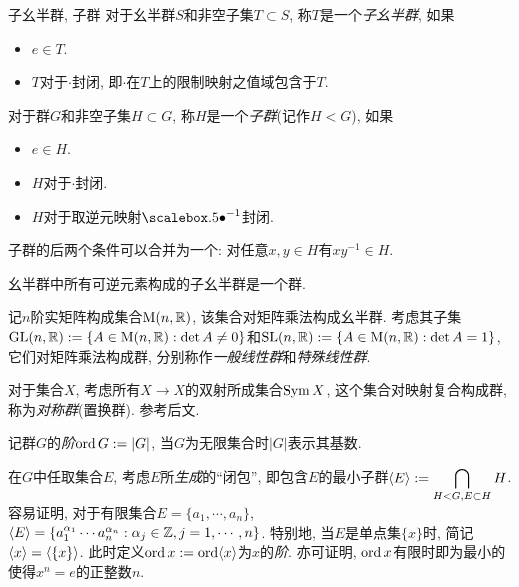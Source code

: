 \begin{definition}{子幺半群, 子群}
	对于幺半群$S$和非空子集$T \subset S$, 称$T$是一个\textit{子幺半群}, 如果
	\begin{itemize}
		\item $e \in T$. 
		\item $T$对于$\cdot$封闭, 即$\cdot$在$T$上的限制映射之值域包含于$T$. 
	\end{itemize}
	对于群$G$和非空子集$H \subset G$, 称$H$是一个\textit{子群}(记作$H<G$), 如果
	\begin{itemize}
		\item $e \in H$. 
		\item $H$对于$\cdot$封闭. 
		\item $H$对于取逆元映射$\bigcdot ^{-1}$封闭. 
	\end{itemize}
\end{definition}
\begin{remark}
	子群的后两个条件可以合并为一个: 对任意$x,y \in H$有$xy^{-1} \in H$. 
\end{remark}

\begin{example}
	幺半群中所有可逆元素构成的子幺半群是一个群. 
\end{example}

\begin{example}
	记$n$阶实矩阵构成集合$\mathrm{M}(n,\mathbb{R})$, 该集合对矩阵乘法构成幺半群. 考虑其子集$\mathrm{GL}(n,\mathbb{R}):= \{ A \in \mathrm{M}(n,\mathbb{R}):\det A \neq 0 \}$和$\mathrm{SL}(n,\mathbb{R}):= \{ A \in \mathrm{M}(n,\mathbb{R}):\det A =1 \}$, 它们对矩阵乘法构成群, 分别称作\textit{一般线性群}和\textit{特殊线性群}. 
\end{example}

\begin{example}
	对于集合$X$, 考虑所有$X \to X$的双射所成集合$\operatorname{Sym} X$, 这个集合对映射复合构成群, 称为\textit{对称群}(置换群). 参考后文. 
\end{example}

记群$G$的\textit{阶}$\operatorname{ord} G:=|G|$, 当$G$为无限集合时$|G|$表示其基数. 

在$G$中任取集合$E$, 考虑$E$所\textit{生成}的“闭包”, 即包含$E$的最小子群$\displaystyle \langle E \rangle:= \bigcap_{H<G,E\subset H} H$. 容易证明, 对于有限集合$E=\{ a_1,\cdots ,a_n \}$, $\langle E \rangle=\{ a_1^{\alpha _1} \cdots a_n^{\alpha _n}:\alpha _j \in \mathbb{Z} ,j=1,\cdots ,n \}$. 特别地, 当$E$是单点集$\{ x \}$时, 简记$\langle x \rangle = \langle \{ x \} \rangle$. 此时定义$\operatorname{ord} x:=\operatorname{ord} \langle x \rangle$为$x$的\textit{阶}. 亦可证明, $\operatorname{ord} x$有限时即为最小的使得$x^n=e$的正整数$n$. 

